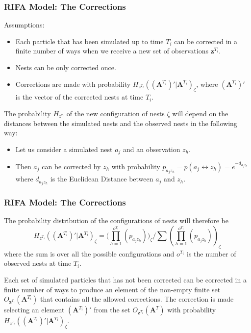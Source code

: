 \documentclass[9pt, xcolor={dvipsnames,svgnames,table}]{beamer}
\begin{document}
\begin{frame}
    \frametitle{RIFA Model: The Corrections}
    Assumptions:
    \begin{itemize}
        \item \textcolor{PineGreen}{Each particle} that has been simulated up to time $T_i$ \textcolor{PineGreen}{can be corrected in a finite number of ways} when we receive a new set of observations $\bm{z}^{T_i}$.
        \item \textcolor{PineGreen}{Nests can be only corrected once}.
        \item \textcolor{PineGreen}{Corrections are made with probability $H_{z^{T_i}}((\bm{A}^{T_i})' | \bm{A}^{T_i})_{\zeta}$}, where $(\bm{A}^{T_i})'$ is the vector of the corrected nests at time $T_i$.
    \end{itemize}
    \textcolor{PineGreen}{The probability $H_{z^{\tau_i}}$ of the new configuration of nests $\zeta$ will depend on the distances between the simulated nests and the observed nests} in the following way:
    \begin{itemize}
        \item Let us consider a simulated nest $a_j$ and an observation $z_h$.
        \item Then $a_j$ can be corrected by $z_h$ with probability $p_{a_j z_h} = p(a_j \leftrightarrow z_h) = e^{-d_{a_j z_h}}$ where $d_{a_j z_h}$ is the Euclidean Distance between $a_j$ and $z_h$.
    \end{itemize}
\end{frame}




\begin{frame}
    \frametitle{RIFA Model: The Corrections}
    \textcolor{PineGreen}{The probability distribution of the configurations of nests} will therefore be 
    \begin{equation*}
            H_{z^{T_i}}((\bm{A}^{T_i})' | \bm{A}^{T_i})_{\zeta} = \Bigg(\prod_{h = 1}^{o^{T_i}} (p_{a_j z_h}) \Bigg)_{\zeta} / \sum (\prod_{h = 1}^{o^{T_i}} (p_{a_j z_h}))_{\zeta} 
    \end{equation*} 
    where the sum is over all the possible configurations and $o^{T_i}$ is the number of observed nests at time $T_i$. 
    
    Each set of simulated particles that has not been corrected can be corrected in a finite number of ways to produce an element of the non-empty finite set $O_{\bm{z}^{T_i}} (\bm{A}^{T_i})$ that contains all the allowed corrections. The correction is made selecting an element $(\bm{A}^{T_i})'$ from the set $O_{\bm{z}^{T_i}} (\bm{A}^T)$ with probability $H_{z^{T_i}}((\bm{A}^{T_i})' | \bm{A}^{T_i})_{\zeta}$.
\end{frame}
\end{document}
